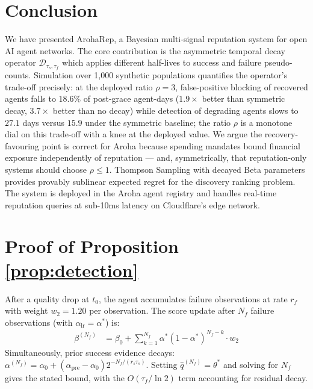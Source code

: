 \documentclass[conference]{IEEEtran}
\begin{document}
\section{Conclusion}
\label{sec:conclusion}

We have presented ArohaRep, a Bayesian multi-signal
reputation system for open AI agent networks. The core
contribution is the asymmetric temporal decay operator
$\mathcal{D}_{\tau_s,\tau_f}$ which applies different
half-lives to success and failure pseudo-counts. Simulation
over 1{,}000 synthetic populations quantifies the operator's
trade-off precisely: at the deployed ratio $\rho = 3$,
false-positive blocking of recovered agents falls to $18.6\%$
of post-grace agent-days ($1.9\times$ better than symmetric
decay, $3.7\times$ better than no decay) while detection of
degrading agents slows to $27.1$ days versus $15.9$ under the
symmetric baseline; the ratio $\rho$ is a monotone dial on
this trade-off with a knee at the deployed value. We argue
the recovery-favouring point is correct for Aroha because
spending mandates bound financial exposure independently of
reputation — and, symmetrically, that reputation-only systems
should choose $\rho \leq 1$. Thompson Sampling with decayed
Beta parameters provides provably sublinear expected regret
for the discovery ranking problem. The system is deployed in
the Aroha agent registry and handles real-time reputation
queries at sub-10ms latency on Cloudflare's edge network.




\appendix

\section{Proof of Proposition \ref{prop:detection}}
\label{app:detection}

After a quality drop at $t_0$, the agent accumulates failure
observations at rate $r_f$ with weight $w_2 = 1.20$ per
observation. The score update after $N_f$ failure
observations (with $\alpha_{\text{lr}} = \alpha^*$) is:
\begin{align}
  \beta^{(N_f)} &= \beta_0 + \sum_{k=1}^{N_f}
    \alpha^*(1-\alpha^*)^{N_f - k} \cdot w_2
\end{align}
Simultaneously, prior success evidence decays:
$\alpha^{(N_f)} = \alpha_0 + (\alpha_{\text{pre}} - \alpha_0)
2^{-N_f / (r_s \tau_s)}$.
Setting $\hat{q}^{(N_f)} = \theta^*$ and solving for
$N_f$ gives the stated bound, with the $O(\tau_f / \ln 2)$
term accounting for residual decay.
\end{document}
